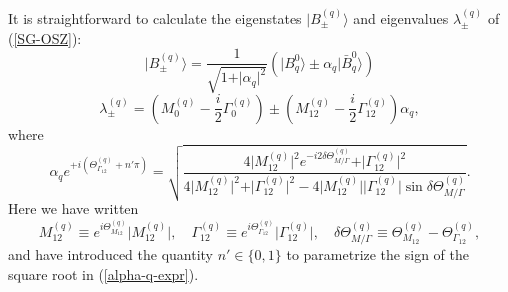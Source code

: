 \documentclass[12pt]{article}
\begin{document}
It is straightforward to calculate the eigenstates 
$\vert B_{\pm}^{(q)}\rangle$ and eigenvalues $\lambda_{\pm}^{(q)}$ 
of (\ref{SG-OSZ}):
\begin{equation}
\vert B_{\pm}^{(q)} \rangle  =
\frac{1}{\sqrt{1+\vert \alpha_q\vert^{2}}}
\left(\vert B^{0}_q\rangle\pm\alpha_q\vert\bar B^{0}_q\rangle\right)
\end{equation}
\begin{equation}\label{lam-pm}
\lambda_{\pm}^{(q)}  =
\left(M_{0}^{(q)}-\frac{i}{2}\Gamma_{0}^{(q)}\right)\pm
\left(M_{12}^{(q)}-\frac{i}{2}\Gamma_{12}^{(q)}\right)\alpha_q,
\end{equation}
where
\begin{equation}\label{alpha-q-expr}
\alpha_q e^{+i\left(\Theta_{\Gamma_{12}}^{(q)}+n'
\pi\right)}=
\sqrt{\frac{4\vert M_{12}^{(q)}\vert^{2}
e^{-i2\delta\Theta_{M/\Gamma}^{(q)}}+\vert\Gamma_{12}^{(q)}\vert^{2}}{4\vert 
M_{12}^{(q)}\vert^{2}+\vert\Gamma_{12}^{(q)}\vert^{2}- 
4\vert M_{12}^{(q)}\vert\vert\Gamma_{12}^{(q)}\vert
\sin\delta\Theta_{M/\Gamma}^{(q)}}}.
\end{equation}
Here we have written
\begin{equation}
M_{12}^{(q)}\equiv e^{i\Theta_{M_{12}}^{(q)}}\vert
M_{12}^{(q)}\vert,\quad \Gamma_{12}^{(q)}\equiv
e^{i\Theta_{\Gamma_{12}}^{(q)}}\vert\Gamma_{12}^{(q)}\vert,\quad
\delta\Theta_{M/\Gamma}^{(q)}\equiv
\Theta_{M_{12}}^{(q)}-\Theta_{\Gamma_{12}}^{(q)},
\end{equation}
and have introduced the quantity $n'\in\{0,1\}$ to parametrize the 
sign of the square root in (\ref{alpha-q-expr}). 
\end{document}
